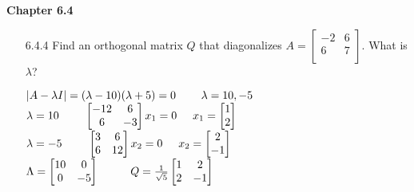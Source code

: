 \documentclass[10pt,twoside,reqno]{article}
\begin{document}
\vspace{5mm}
\textbf{Chapter 6.4}
\begin{enumerate}
\item[6.4.4] Find an orthogonal matrix $Q$ that diagonalizes $A=
\begin{bmatrix}
-2&6\\
6&7\\
\end{bmatrix}$. What is $\lambda$?
\\ \vspace{2mm}
\begin{center}
$
|A- \lambda I|=
(\lambda-10)(\lambda+5) = 0
\hspace{8mm} \lambda=10,-5
$\\
$
\lambda = 10 \hspace{8mm}
\begin{bmatrix}
-12&6\\
6&-3\\
\end{bmatrix}
x_1=0
\hspace{5mm}
x_1 = 
\begin{bmatrix}
1\\
2\\
\end{bmatrix}
$ \\
$
\lambda = -5 \hspace{8mm}
\begin{bmatrix}
3&6\\
6&12\\
\end{bmatrix}
x_2=0
\hspace{5mm}
x_2 = 
\begin{bmatrix}
2\\
-1\\
\end{bmatrix}
$ \\
$
\Lambda = 
\begin{bmatrix}
10&0\\
0&-5\\
\end{bmatrix}
\hspace{10mm}
Q=
\frac{1}{\sqrt{5}}
\begin{bmatrix}
1&2\\
2&-1\\
\end{bmatrix}
$ \\
\end{center}


\end{enumerate}
\end{document}
